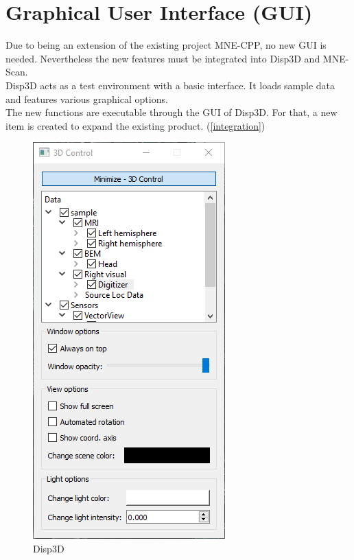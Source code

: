\section{Graphical User Interface (GUI)}

Due to being an extension of the existing project MNE-CPP, no new GUI is needed. Nevertheless the new features must be integrated into Disp3D and MNE-Scan. \\

Disp3D acts as a test environment with a basic interface. It loads sample data and features various graphical options. \\
The new functions are executable through the GUI of Disp3D. For that, a new item is created to expand the existing product. (\ref{integration}) \\ 
	
\begin{figure}
	
	\begin{center}
		
		\includegraphics[scale=0.5]{Figures/Disp3D.PNG}
	
	\end{center}
	
	\caption{Disp3D}

\end{figure}
~\\
~\\

